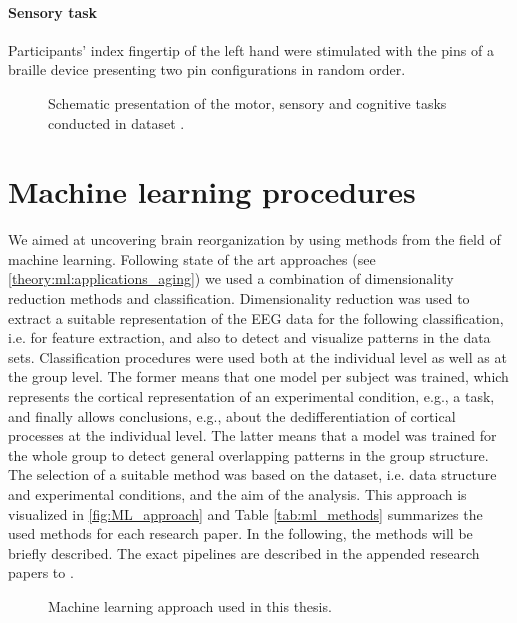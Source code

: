 \paragraph{Sensory task}
Participants' index fingertip of the left hand were stimulated with the pins of a braille device presenting two pin configurations in random order. 

\begin{figure}[h]
\begin{center}

\caption[Schematic presentation of the motor, sensory and cognitive tasks conducted in dataset .]{Schematic presentation of the motor, sensory and cognitive tasks conducted in dataset .}
\label{fig:DSII_exp3}
\end{center}
\end{figure}

\section{Machine learning procedures} 
We aimed at uncovering brain reorganization by using methods from the field of machine learning. Following state of the art approaches (see \autoref{theory:ml:applications_aging}) we used a combination of dimensionality reduction methods and classification. Dimensionality reduction was used to extract a suitable representation of the EEG data for the following classification, i.e. for feature extraction, and also to detect and visualize patterns in the data sets. Classification procedures were used both at the individual level as well as at the group level. The former means that one model per subject was trained, which represents the cortical representation of an experimental condition, e.g., a task, and finally allows conclusions, e.g., about the dedifferentiation of cortical processes at the individual level. The latter means that a model was trained for the whole group to detect general overlapping patterns in the group structure. The selection of a suitable method was based on the dataset, i.e. data structure and experimental conditions, and the aim of the analysis. This approach is visualized in \autoref{fig:ML_approach} and Table \autoref{tab:ml_methods}  summarizes the used methods for each research paper. In the following, the methods will be briefly described. The exact pipelines are described in the appended research papers  to .

\begin{figure}[h]
\begin{center}

\caption[Machine learning approach used in this thesis]{Machine learning approach used in this thesis.}
\label{fig:ML_approach}
\end{center}
\end{figure}

